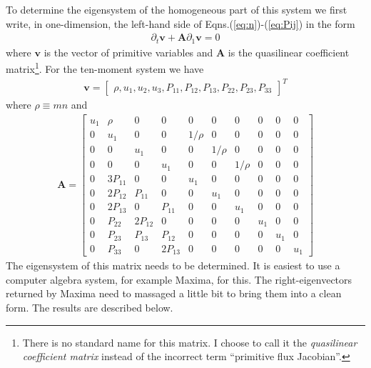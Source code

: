 \documentclass[11pt, reqno]{amsart}
\newcommand{\mvec}[1]{\mathbf{#1}}
\theoremstyle{definition}
\begin{document}
To determine the eigensystem of the homogeneous part of this system we
first write, in one-dimension, the left-hand side of
Eqns.\thinspace(\ref{eq:n})-(\ref{eq:Pij}) in the form
\begin{align}
  \partial_t{\mvec{v}} + \mvec{A}\partial_{1}{\mvec{v}} = 0 \label{eq:qlForm}
\end{align}
where $\mvec{v}$ is the vector of primitive variables and $\mvec{A}$
is the quasilinear coefficient matrix\footnote{There is no standard
  name for this matrix. I choose to call it the \emph{quasilinear
    coefficient matrix} instead of the incorrect term ``primitive flux
  Jacobian''.}. For the ten-moment system we have
\begin{align}
  \mvec{v} = 
    \left[
    \begin{matrix}
      \rho,
      u_1,
      u_2,
      u_3,
      P_{11},
      P_{12},
      P_{13},
      P_{22},
      P_{23},
      P_{33}
    \end{matrix}
  \right]^T
\end{align}
where $\rho \equiv mn$ and 
\begin{align}
  \mvec{A} = 
    \left[
    \begin{matrix}
      u_1  & \rho   & 0      & 0     & 0     & 0     & 0      & 0    & 0    & 0 \\
      0    & u_1    & 0      & 0     & 1/\rho & 0     & 0     & 0    & 0    & 0 \\
      0    & 0      & u_1    & 0     & 0     & 1/\rho & 0     & 0    & 0    & 0 \\
      0    & 0      & 0      & u_1   & 0     & 0     & 1/\rho & 0    & 0    & 0 \\
      0    & 3P_{11} & 0      & 0     & u_1   & 0     & 0      & 0    & 0    & 0 \\
      0    & 2P_{12} & P_{11} & 0     & 0    & u_1    & 0      & 0    & 0    & 0 \\
      0    & 2P_{13} & 0      & P_{11} & 0    & 0      & u_1    & 0    & 0    & 0 \\
      0    & P_{22}  & 2P_{12} & 0     & 0    & 0      & 0     & u_1   & 0    & 0 \\
      0    & P_{23}  & P_{13}  & P_{12} & 0    & 0      & 0     & 0     & u_1  & 0 \\
      0    & P_{33}  & 0      & 2P_{13} & 0   & 0      & 0     & 0     & 0    & u_1
    \end{matrix}
  \right]
\end{align}
The eigensystem of this matrix needs to be determined. It is easiest
to use a computer algebra system, for example Maxima, for this. The
right-eigenvectors returned by Maxima need to massaged a little bit to
bring them into a clean form. The results are described below.
\end{document}
